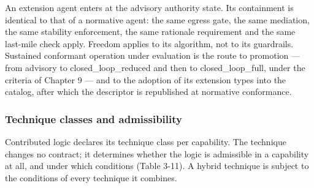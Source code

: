 An extension agent enters at the advisory authority state. Its
containment is identical to that of a normative agent: the same egress
gate, the same mediation, the same stability enforcement, the same
rationale requirement and the same last-mile check apply. Freedom
applies to its algorithm, not to its guardrails. Sustained conformant
operation under evaluation is the route to promotion --- from advisory
to closed\_\allowbreak{}loop\_\allowbreak{}reduced and then to
closed\_\allowbreak{}loop\_\allowbreak{}full, under the criteria of
Chapter 9 --- and to the adoption of its extension types into the
catalog, after which the descriptor is republished at normative
conformance.

\hypertarget{technique-classes-and-admissibility}{%
\subsubsection{Technique classes and admissibility}\label{technique-classes-and-admissibility}}

Contributed logic declares its technique class per capability. The
technique changes no contract; it determines whether the logic is
admissible in a capability at all, and under which conditions (Table
3-11). A hybrid technique is subject to the conditions of every
technique it combines.


